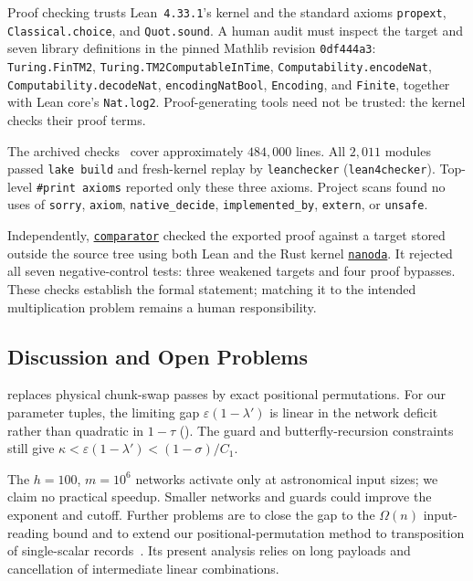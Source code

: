 \documentclass[11pt]{article}
\theoremstyle{definition}
\renewcommand{\label}[1]{}%
\newcommand{\eps}{\varepsilon}
\begin{document}
Proof checking trusts Lean~\texttt{4.33.1}'s kernel and the standard axioms
\texttt{propext}, \texttt{Classical.\allowbreak choice}, and
\texttt{Quot.\allowbreak sound}.
A human audit must inspect the target and seven library definitions in
the pinned Mathlib revision \texttt{0df444a3}:
\texttt{Turing.\allowbreak FinTM2},
\texttt{Turing.\allowbreak TM2Computable\allowbreak InTime},
\texttt{Computability.\allowbreak encodeNat},
\texttt{Computability.\allowbreak decodeNat}, \texttt{encodingNatBool},
\texttt{Encoding}, and \texttt{Finite}, together with Lean core's \texttt{Nat.log2}.
Proof-generating tools need not be trusted: the kernel checks their proof terms.

The archived checks~\cite{Lean26} cover approximately $484{,}000$ lines.
All $2{,}011$ modules passed \texttt{lake build} and fresh-kernel replay by
\texttt{leanchecker} (\texttt{lean4checker}).
Top-level \texttt{\#print axioms} reported only these three axioms.
Project scans found no uses of \texttt{sorry}, \texttt{axiom},
\texttt{native\_decide}, \texttt{implemented\_by}, \texttt{extern}, or \texttt{unsafe}.

Independently,
\href{https://github.com/leanprover/comparator}{\texttt{comparator}}
checked the exported proof against a target stored outside the source tree
using both Lean and the Rust kernel
\href{https://github.com/ammkrn/nanoda_lib}{\texttt{nanoda}}.
It rejected all seven negative-control tests: three weakened targets and
four proof bypasses.
These checks establish the formal statement; matching it to the intended
multiplication problem remains a human responsibility.

\subsection{Discussion and Open Problems}\label{sec:discussion}

 replaces physical chunk-swap passes by exact positional
permutations. For our parameter tuples, the limiting gap
$\eps(1-\lambda')$ is linear in the network deficit rather than quadratic in
$1-\tau$ ().
The guard and butterfly-recursion constraints still give
$\kappa<\eps(1-\lambda')<(1-\sigma)/C_1$.

The $h=100$, $m=10^6$ networks activate only at astronomical input sizes;
we claim no practical speedup.
Smaller networks and guards could improve the exponent and cutoff.
Further problems are to close the gap to the $\Omega(n)$ input-reading
bound and to extend our positional-permutation method to transposition of
single-scalar records~\cite{HvdH25}.
Its present analysis relies on long payloads and cancellation of intermediate
linear combinations.
\end{document}
